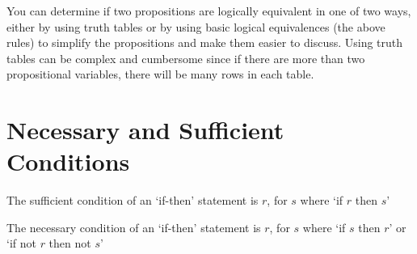 You can determine if two propositions are logically equivalent in one of two ways, either by using truth tables or by
 using basic logical equivalences (the above rules) to simplify the propositions and make them easier to discuss. Using
 truth tables can be complex and cumbersome since if there are more than two propositional variables, there will be many
 rows in each table.

\section*{Necessary and Sufficient Conditions}

The sufficient condition of an `if-then' statement is $r$, for $s$ where `if $r$ then $s$'

The necessary condition of an `if-then' statement is $r$, for $s$ where `if $s$ then $r$' or `if not $r$ then not $s$'